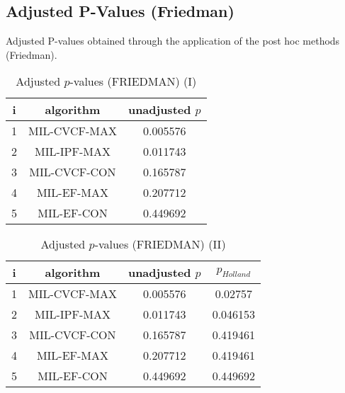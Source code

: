 \documentclass[a4paper,10pt]{article}
\begin{document}
\begin{landscape}
\newpage

\section{Adjusted P-Values (Friedman)}


Adjusted P-values obtained through the application of the post hoc methods (Friedman).

\begin{table}[!htp]
\centering\small
\begin{tabular}{ccc}
i&algorithm&unadjusted $p$\\
\hline1&MIL-CVCF-MAX&0.005576\\2&MIL-IPF-MAX&0.011743\\3&MIL-CVCF-CON&0.165787\\4&MIL-EF-MAX&0.207712\\5&MIL-EF-CON&0.449692\\\hline
\end{tabular}
\caption{Adjusted $p$-values (FRIEDMAN) (I)}
\end{table}
\begin{table}[!htp]
\centering\small
\begin{tabular}{cccc}
i&algorithm&unadjusted $p$&$p_{Holland}$\\
\hline1&MIL-CVCF-MAX&0.005576&0.02757\\2&MIL-IPF-MAX&0.011743&0.046153\\3&MIL-CVCF-CON&0.165787&0.419461\\4&MIL-EF-MAX&0.207712&0.419461\\5&MIL-EF-CON&0.449692&0.449692\\\hline
\end{tabular}
\caption{Adjusted $p$-values (FRIEDMAN) (II)}
\end{table}

\newpage
\end{landscape}
\end{document}
